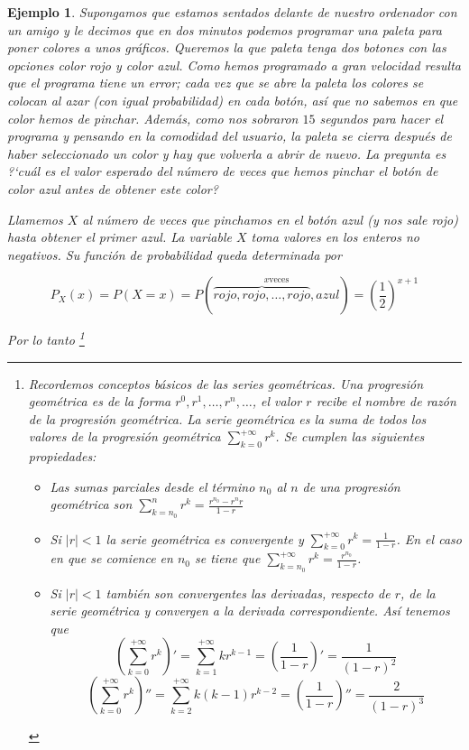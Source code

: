 \documentclass[12pt]{report}
\newtheorem{example}[definition]{Ejemplo}
\begin{document}
\begin{example} Supongamos que estamos sentados delante de nuestro ordenador con un amigo y
le decimos que en dos minutos podemos programar una paleta  para poner colores a unos
gráficos. Queremos la que paleta tenga dos botones con las opciones color rojo y color azul.
Como hemos programado a gran velocidad resulta que el programa tiene un error; cada vez que
se abre la paleta los colores se colocan al azar (con igual probabilidad) en cada botón,
así que no sabemos en que color hemos de pinchar. Además, como nos sobraron $15$ segundos
para hacer el programa y pensando en la
 comodidad del usuario, la paleta se cierra después de haber seleccionado  un
color y hay que volverla a abrir de nuevo. La pregunta es ?`cuál es el valor esperado del
número de veces que hemos pinchar el botón de color azul antes de obtener este color?

Llamemos $X$ al número de veces que pinchamos en el botón azul (y nos sale rojo) hasta
obtener el primer azul. La variable $X$ toma valores en los enteros no negativos. Su
función de probabilidad queda determinada por

$$P_X(x)=P(X=x)=P(\stackrel{x \mbox{veces}}{\overbrace{rojo, rojo,\ldots,rojo},azul})
=\left(\frac{1}{2}\right)^{x+1}$$

Por lo tanto \footnote{ Recordemos conceptos básicos de las  series geométricas. Una
progresión geométrica es de la forma $r^0, r^1,\ldots,r^n,\ldots$, el valor $r$ recibe el
nombre de razón de la progresión geométrica. La serie geométrica es la suma de todos los
valores de la progresión geométrica $\sum_{k=0}^{+\infty} r^k$. Se cumplen las siguientes
propiedades:

\begin{itemize}
\item Las sumas parciales desde el término $n_0$ al $n$ de una progresión geométrica son
 $\sum_{k=n_0}^n r^k=\frac{r^{n_0}- r^n r}{1-r}$
\item Si $|r|<1$ la serie geométrica es convergente y $\sum_{k=0}^{+\infty }
r^k=\frac{1}{1-r}$. En el caso en que se comience en $n_0$ se tiene que
$\sum_{k=n_0}^{+\infty} r^k=\frac{r^{n_0}}{1-r}$.
\item  Si $|r|<1$  también son convergentes las derivadas, respecto de $r$,
 de la serie geométrica y convergen a la derivada correspondiente. Así tenemos que
$$\left(\sum_{k=0}^{+\infty} r^k\right)'=\sum_{k=1}^{+\infty}k
r^{k-1}=\left(\frac{1}{1-r}\right)'=\frac{1}{(1-r)^2}$$
$$\left(\sum_{k=0}^{+\infty} r^k\right)''=\sum_{k=2}^{+\infty}k (k-1)
r^{k-2}=\left(\frac{1}{1-r}\right)''=\frac{2}{(1-r)^3}$$
\end{itemize}}



\end{example}
\end{document}

